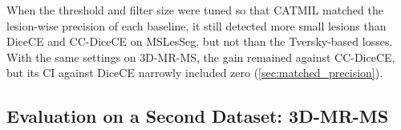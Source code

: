 \begin{table}[t]
\centering
\caption{As \cref{tab:loss_comparison_small_lesion}, after removing
predicted components smaller than 5 voxels (PP5).}
\label{tab:loss_comparison_small_lesion_pp5}
\end{table}

When the threshold and filter size were tuned so that CATMIL matched the
lesion-wise precision of each baseline, it still detected more small
lesions than DiceCE and CC-DiceCE on MSLesSeg, but not than the
Tversky-based losses. With the same settings on 3D-MR-MS, the gain
remained against CC-DiceCE, but its CI against DiceCE narrowly included
zero (\cref{sec:matched_precision}).

\subsection{Evaluation on a Second Dataset: 3D-MR-MS}

